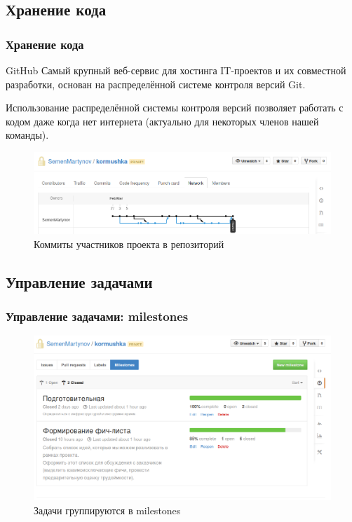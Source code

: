 \documentclass{beamer}
\begin{document}

\subsection{Хранение кода}

\begin{frame}
\frametitle{Хранение кода}

\begin{block}{GitHub}
Самый крупный веб-сервис для хостинга IT-проектов и их совместной разработки, основан на распределённой системе контроля версий Git.
\end{block}

Использование распределённой системы контроля версий позволяет работать с кодом даже когда нет интернета (актуально для некоторых членов нашей команды).

\begin{figure}
\includegraphics[scale=0.30]{res/r1_git}
\caption{Коммиты участников проекта в репозиторий}
\end{figure}

\end{frame}


\subsection{Управление задачами}

\begin{frame}
\frametitle{Управление задачами: milestones}

\begin{figure}
\includegraphics[scale=0.30]{res/r1_milestones}
\caption{Задачи группируются в milestones}
\end{figure}

\end{frame}
\end{document}
